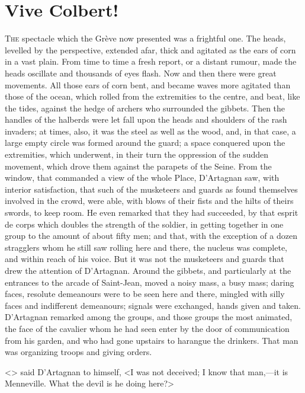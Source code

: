 \chapter{Vive Colbert!}
	
\lettrine{T}{he} spectacle which the Grève now presented was a frightful one. The heads, levelled by the perspective, extended afar, thick and agitated as the ears of corn in a vast plain. From time to time a fresh report, or a distant rumour, made the heads oscillate and thousands of eyes flash. Now and then there were great movements. All those ears of corn bent, and became waves more agitated than those of the ocean, which rolled from the extremities to the centre, and beat, like the tides, against the hedge of archers who surrounded the gibbets. Then the handles of the halberds were let fall upon the heads and shoulders of the rash invaders; at times, also, it was the steel as well as the wood, and, in that case, a large empty circle was formed around the guard; a space conquered upon the extremities, which underwent, in their turn the oppression of the sudden movement, which drove them against the parapets of the Seine. From the window, that commanded a view of the whole Place, D'Artagnan saw, with interior satisfaction, that such of the musketeers and guards as found themselves involved in the crowd, were able, with blows of their fists and the hilts of theirs swords, to keep room. He even remarked that they had succeeded, by that esprit de corps which doubles the strength of the soldier, in getting together in one group to the amount of about fifty men; and that, with the exception of a dozen stragglers whom he still saw rolling here and there, the nucleus was complete, and within reach of his voice. But it was not the musketeers and guards that drew the attention of D'Artagnan. Around the gibbets, and particularly at the entrances to the arcade of Saint-Jean, moved a noisy mass, a busy mass; daring faces, resolute demeanours were to be seen here and there, mingled with silly faces and indifferent demeanours; signals were exchanged, hands given and taken. D'Artagnan remarked among the groups, and those groups the most animated, the face of the cavalier whom he had seen enter by the door of communication from his garden, and who had gone upstairs to harangue the drinkers. That man was organizing troops and giving orders.

<> said D'Artagnan to himself, <I was not deceived; I know that man,—it is Menneville. What the devil is he doing here?>

